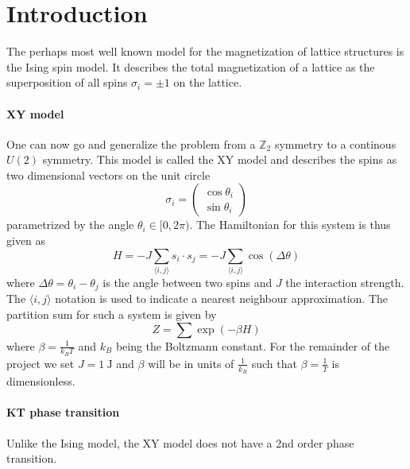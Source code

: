 \section{Introduction}
The perhaps most well known model for the magnetization of lattice structures is the Ising spin model. It describes the total magnetization of a lattice as the superposition of all spins $\sigma_i = \pm 1$ on the lattice.

\paragraph{XY model}
One can now go and generalize the problem from a $\mathbb{Z}_2$ symmetry to a continous $U(2)$ symmetry. This model is called the XY model and describes the spins as two dimensional vectors on the unit circle
\begin{equation}\label{eq:hamiltonian}
	\sigma_i = \begin{pmatrix}
		\cos{\theta_i} \\ \sin{\theta_i}
	\end{pmatrix}
\end{equation}
parametrized by the angle $\theta_i \in [0,2\pi)$. The Hamiltonian for this system is thus given as
\begin{equation}\label{eq:partition}
	H = -J \sum_{\langle i,j \rangle}{s_i \cdot s_j} = -J \sum_{\langle i,j \rangle}{\cos{(\Delta \theta)}}
\end{equation}
where $\Delta \theta = \theta_i - \theta_j$ is the angle between two spins and $J$ the interaction strength. The $\langle i,j \rangle$ notation is used to indicate a nearest neighbour approximation. The partition sum for such a system is given by
\begin{equation}
	Z = \sum{\exp{(-\beta H)}}
\end{equation}
where $\beta = \frac{1}{k_B T}$ and $k_B$ being the Boltzmann constant.  For the remainder of the project we set $J = \SI{1}{\joule}$ and $\beta$ will be in units of $\frac{1}{k_B}$ such that $\beta = \frac{1}{T}$ is dimensionless.

\paragraph{KT phase transition}
Unlike the Ising model, the XY model does not have a 2nd order phase transition.